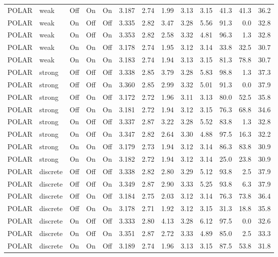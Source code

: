 \begin{longtable}{llcccrrrrrrrr}
POLAR & weak & Off & On & On & 3.187 & 2.74 & 1.99 & 3.13 & 3.15 & 41.3 & 41.3 & 36.2 \\
POLAR & weak & On & Off & Off & 3.335 & 2.82 & 3.47 & 3.28 & 5.56 & 91.3 & 0.0 & 32.8 \\
POLAR & weak & On & Off & On & 3.353 & 2.82 & 2.58 & 3.32 & 4.81 & 96.3 & 1.3 & 32.8 \\
POLAR & weak & On & On & Off & 3.178 & 2.74 & 1.95 & 3.12 & 3.14 & 33.8 & 32.5 & 30.7 \\
POLAR & weak & On & On & On & 3.183 & 2.74 & 1.94 & 3.13 & 3.15 & 81.3 & 78.8 & 30.7 \\
POLAR & strong & Off & Off & Off & 3.338 & 2.85 & 3.79 & 3.28 & 5.83 & 98.8 & 1.3 & 37.3 \\
POLAR & strong & Off & Off & On & 3.360 & 2.85 & 2.99 & 3.32 & 5.01 & 91.3 & 0.0 & 37.9 \\
POLAR & strong & Off & On & Off & 3.172 & 2.72 & 1.96 & 3.11 & 3.13 & 80.0 & 52.5 & 35.8 \\
POLAR & strong & Off & On & On & 3.181 & 2.72 & 1.94 & 3.12 & 3.15 & 76.3 & 68.8 & 34.6 \\
POLAR & strong & On & Off & Off & 3.337 & 2.87 & 3.22 & 3.28 & 5.52 & 83.8 & 1.3 & 32.8 \\
POLAR & strong & On & Off & On & 3.347 & 2.82 & 2.64 & 3.30 & 4.88 & 97.5 & 16.3 & 32.2 \\
POLAR & strong & On & On & Off & 3.179 & 2.73 & 1.94 & 3.12 & 3.14 & 86.3 & 83.8 & 30.9 \\
POLAR & strong & On & On & On & 3.182 & 2.72 & 1.94 & 3.12 & 3.14 & 25.0 & 23.8 & 30.9 \\
POLAR & discrete & Off & Off & Off & 3.338 & 2.82 & 2.80 & 3.29 & 5.12 & 93.8 & 2.5 & 37.9 \\
POLAR & discrete & Off & Off & On & 3.349 & 2.87 & 2.90 & 3.33 & 5.25 & 93.8 & 6.3 & 37.9 \\
POLAR & discrete & Off & On & Off & 3.184 & 2.75 & 2.03 & 3.12 & 3.14 & 76.3 & 73.8 & 36.4 \\
POLAR & discrete & Off & On & On & 3.178 & 2.71 & 1.92 & 3.12 & 3.15 & 31.3 & 18.8 & 35.8 \\
POLAR & discrete & On & Off & Off & 3.333 & 2.80 & 4.13 & 3.28 & 6.12 & 97.5 & 0.0 & 32.6 \\
POLAR & discrete & On & Off & On & 3.351 & 2.87 & 2.72 & 3.33 & 4.89 & 85.0 & 2.5 & 33.3 \\
POLAR & discrete & On & On & Off & 3.189 & 2.74 & 1.96 & 3.13 & 3.15 & 87.5 & 53.8 & 31.8 \\

\end{longtable}
